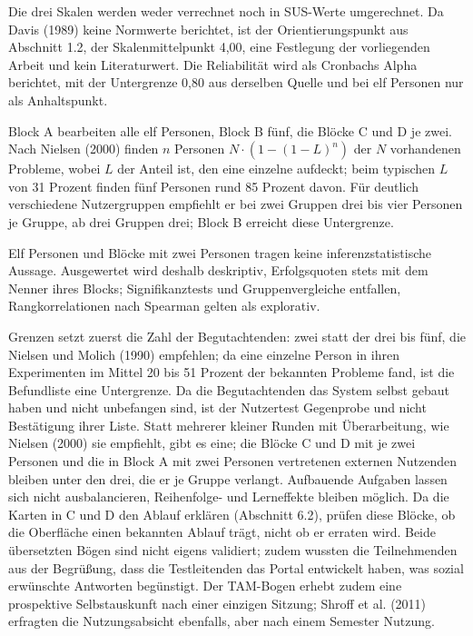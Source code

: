 Die drei Skalen werden weder verrechnet noch in SUS-Werte umgerechnet. Da Davis (1989) keine Normwerte berichtet, ist der Orientierungspunkt aus Abschnitt 1.2, der Skalenmittelpunkt 4,00, eine Festlegung der vorliegenden Arbeit und kein Literaturwert. Die Reliabilität wird als Cronbachs Alpha berichtet, mit der Untergrenze 0,80 aus derselben Quelle und bei elf Personen nur als Anhaltspunkt.

Block A bearbeiten alle elf Personen, Block B fünf, die Blöcke C und D je zwei. Nach Nielsen (2000) finden $n$ Personen $N \cdot (1 - (1 - L)^n)$ der $N$ vorhandenen Probleme, wobei $L$ der Anteil ist, den eine einzelne aufdeckt; beim typischen $L$ von 31 Prozent finden fünf Personen rund 85 Prozent davon. Für deutlich verschiedene Nutzergruppen empfiehlt er bei zwei Gruppen drei bis vier Personen je Gruppe, ab drei Gruppen drei; Block B erreicht diese Untergrenze.

Elf Personen und Blöcke mit zwei Personen tragen keine inferenzstatistische Aussage. Ausgewertet wird deshalb deskriptiv, Erfolgsquoten stets mit dem Nenner ihres Blocks; Signifikanztests und Gruppenvergleiche entfallen, Rangkorrelationen nach Spearman gelten als explorativ.

Grenzen setzt zuerst die Zahl der Begutachtenden: zwei statt der drei bis fünf, die Nielsen und Molich (1990) empfehlen; da eine einzelne Person in ihren Experimenten im Mittel 20 bis 51 Prozent der bekannten Probleme fand, ist die Befundliste eine Untergrenze. Da die Begutachtenden das System selbst gebaut haben und nicht unbefangen sind, ist der Nutzertest Gegenprobe und nicht Bestätigung ihrer Liste. Statt mehrerer kleiner Runden mit Überarbeitung, wie Nielsen (2000) sie empfiehlt, gibt es eine; die Blöcke C und D mit je zwei Personen und die in Block A mit zwei Personen vertretenen externen Nutzenden bleiben unter den drei, die er je Gruppe verlangt. Aufbauende Aufgaben lassen sich nicht ausbalancieren, Reihenfolge- und Lerneffekte bleiben möglich. Da die Karten in C und D den Ablauf erklären (Abschnitt 6.2), prüfen diese Blöcke, ob die Oberfläche einen bekannten Ablauf trägt, nicht ob er erraten wird. Beide übersetzten Bögen sind nicht eigens validiert; zudem wussten die Teilnehmenden aus der Begrüßung, dass die Testleitenden das Portal entwickelt haben, was sozial erwünschte Antworten begünstigt. Der TAM-Bogen erhebt zudem eine prospektive Selbstauskunft nach einer einzigen Sitzung; Shroff et al. (2011) erfragten die Nutzungsabsicht ebenfalls, aber nach einem Semester Nutzung.

